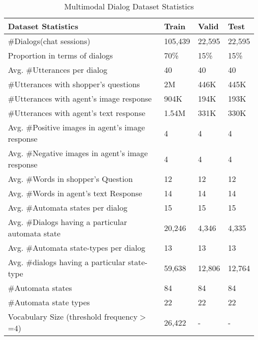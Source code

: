 \documentclass[10pt,a4paper]{article}
\begin{document}
\begin{table}
{\normalsize
\begin{center}
\begin{tabular}{|p{9.5cm}|p{3cm}|p{3cm}|p{3cm}|}\hline
\textbf{Dataset Statistics} & \textbf{Train} & \textbf{Valid} & \textbf{Test} \\ \hline
\#Dialogs(chat sessions) & 105,439 & 22,595 & 22,595 \\ \hline
Proportion in terms of dialogs & 70\% & 15\% & 15\% \\ \hline
Avg. \#Utterances per dialog & 40 & 40 & 40\\\hline
\#Utterances with shopper's questions & 2M & 446K & 445K \\\hline
\#Utterances with agent's image response & 904K & 194K & 193K \\\hline
\#Utterances with agent's text response & 1.54M &331K & 330K \\\hline
Avg. \#Positive images in agent's image response & 4 & 4 & 4 \\\hline
Avg. \#Negative images in agent's image response & 4 & 4 & 4\\\hline
Avg. \#Words in shopper's Question & 12 & 12 & 12\\\hline
Avg. \#Words in agent's text Response & 14 & 14 & 14\\\hline
Avg. \#Automata states per dialog & 15 & 15 & 15\\\hline
Avg. \#Dialogs having a particular automata state & 20,246 & 4,346 & 4,335\\ \hline
Avg. \#Automata state-types per dialog & 13 & 13 & 13\\\hline
Avg. \#dialogs having a particular state-type & 59,638 & 12,806 & 12,764\\\hline
\#Automata states & 84 & 84  & 84 \\\hline
\#Automata state types & 22 & 22 & 22 \\\hline
Vocabulary Size (threshold frequency$>$=4) & 26,422 & - & -\\\hline
\end{tabular}
\end{center}
}
\caption{Multimodal Dialog Dataset Statistics}
\label{tab:dataset_stats}
\end{table}
\end{document}

